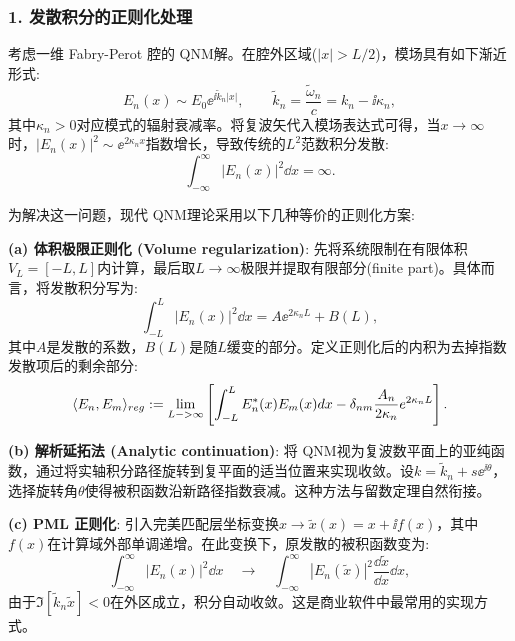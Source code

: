 \subsubsection*{1. 发散积分的正则化处理}

考虑一维 Fabry-Perot 腔的 QNM解。在腔外区域($|x|>L/2$)，模场具有如下渐近形式:
\begin{equation}
E_n(x) \sim E_0 \ee^{\ii \tilde{k}_n |x|}, \qquad \tilde{k}_n = \frac{\tilde{\omega}_n}{c} = k_n - \ii \kappa_n,
\label{eq:qnm_spatial_growth_detail}
\end{equation}
其中$\kappa_n > 0$对应模式的辐射衰减率。将复波矢代入模场表达式可得，当$x\to\infty$时，$|E_n(x)|^2 \sim \ee^{2\kappa_n x}$指数增长，导致传统的$L^2$范数积分发散:
\begin{equation}
\int_{-\infty}^{\infty} |E_n(x)|^2 \dd x = \infty.
\label{eq:l2_divergence}
\end{equation}

为解决这一问题，现代 QNM理论采用以下几种等价的正则化方案:

\textbf{(a) 体积极限正则化 (Volume regularization)}: 先将系统限制在有限体积$V_L=[-L,L]$内计算，最后取$L\to\infty$极限并提取有限部分(finite part)。具体而言，将发散积分写为:
\begin{equation}
\int_{-L}^{L} |E_n(x)|^2 \dd x = A \ee^{2\kappa_n L} + B(L),
\end{equation}
其中$A$是发散的系数，$B(L)$是随$L$缓变的部分。定义正则化后的内积为去掉指数发散项后的剩余部分:
\begin{equation}
\langle E_n, E_m \rangle_{\rm reg} := \lim_{L\to\infty} \left[ \int_{-L}^{L} E_n^*(x) E_m(x) \dd x - \delta_{nm} \frac{A_n}{2\kappa_n}\ee^{2\kappa_n L} \right].
\label{eq:volume_regularization}
\end{equation}

\textbf{(b) 解析延拓法 (Analytic continuation)}: 将 QNM视为复波数平面上的亚纯函数，通过将实轴积分路径旋转到复平面的适当位置来实现收敛。设$k = \tilde{k}_n + s \ee^{\ii\theta}$，选择旋转角$\theta$使得被积函数沿新路径指数衰减。这种方法与留数定理自然衔接。

\textbf{(c) PML 正则化}: 引入完美匹配层坐标变换$x \to \tilde{x}(x) = x + \ii f(x)$，其中$f(x)$在计算域外部单调递增。在此变换下，原发散的被积函数变为:
\begin{equation}
\int_{-\infty}^{\infty} |E_n(x)|^2 \dd x \quad \longrightarrow \quad \int_{-\infty}^{\infty} |E_n(\tilde{x})|^2 \frac{\dd\tilde{x}}{\dd x} \dd x,
\end{equation}
由于$\Im[\tilde{k}_n \tilde{x}] < 0$在外区成立，积分自动收敛。这是商业软件中最常用的实现方式。

